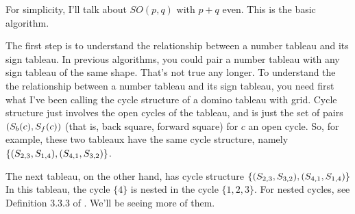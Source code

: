 \documentclass[12pt]{article}
\numberwithin{equation}{section}
\theoremstyle{definition}
\theoremstyle{remark}
\begin{document}
  For simplicity, I'll talk about $SO(p,q)$ with $p + q$ even.
  This is the basic algorithm.

  The first step is to understand the relationship between a number tableau and its sign tableau.
  In previous algorithms, you could pair a number tableau with any sign tableau of the same shape.
  That's not true any longer.
  To understand the the relationship between a number tableau and its sign tableau, you need first what I've been calling the cycle structure of a domino tableau with grid.
  Cycle structure just involves the open cycles of the tableau, and is just the set of pairs $(\Sb(c), \Sf(c))$ (that is, back square, forward square) for $c$ an open cycle.
  So, for example, these two tableaux have the same cycle structure, namely $\{(\ss23, \ss14), (\ss41, \ss32)\}$.



  \begin{figure}[H]
    \centering
  \end{figure}

  The next tableau, on the other hand, has cycle structure $\{(\ss23, \ss32), (\ss41, \ss14)\}$
  In this tableau, the cycle $\{4\}$ is nested in the cycle $\{1, 2, 3\}$.
  For nested cycles, see Definition 3.3.3 of \cite{garfinkle_1993}.
  We'll be seeing more of them.
\end{document}
